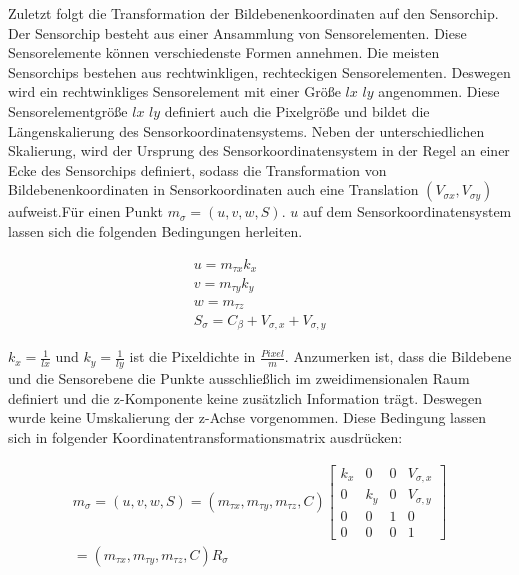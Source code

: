 Zuletzt folgt die Transformation der Bildebenenkoordinaten auf den Sensorchip. Der Sensorchip besteht aus einer Ansammlung von Sensorelementen. Diese Sensorelemente können verschiedenste Formen annehmen. Die meisten Sensorchips bestehen aus rechtwinkligen, rechteckigen Sensorelementen. Deswegen wird ein rechtwinkliges Sensorelement mit einer Größe $lx$ $ly$ angenommen. Diese Sensorelementgröße $lx$ $ly$ definiert auch die Pixelgröße und bildet die Längenskalierung des Sensorkoordinatensystems. Neben der unterschiedlichen Skalierung, wird der Ursprung des Sensorkoordinatensystem in der Regel an einer Ecke des Sensorchips definiert, sodass die Transformation von Bildebenenkoordinaten in Sensorkoordinaten auch eine Translation $(V_{\sigma x},V_{\sigma y})$ aufweist.Für einen Punkt $m_\sigma = ({u},{v},{w},S)$. ${u}$ auf dem Sensorkoordinatensystem lassen sich die folgenden Bedingungen herleiten. %

\begin{gather}	
	{u}=m_{\tau x} k_x \\
	{v}=m_{\tau y} k_y \\
	{w}=m_{\tau z} \\
	S_\sigma = C_{\beta} + V_{\sigma,x} + V_{\sigma,y}
\end{gather}

$k_x= \frac{1}{lx}$ und $k_y=\frac{1}{ly}$ ist die Pixeldichte in $\frac{Pixel}{m}$.
Anzumerken ist, dass die Bildebene und die Sensorebene die Punkte ausschließlich im zweidimensionalen Raum definiert und die z-Komponente keine zusätzlich Information trägt. Deswegen wurde keine Umskalierung der z-Achse vorgenommen. Diese Bedingung lassen sich in folgender Koordinatentransformationsmatrix ausdrücken:

\begin{gather}
	m_\sigma=({u},{v},{w},S)=(m_{\tau x},m_{\tau y},m_{\tau z},C)
	\begin{bmatrix}
		k_x&0&0&V_{\sigma,x}\\
		0&k_y&0&V_{\sigma,y}\\
		0&0&1&0\\
		0&0&0&1
	\end{bmatrix}\\
	=(m_{\tau x},m_{\tau y},m_{\tau z},C) R_\sigma
\end{gather}

